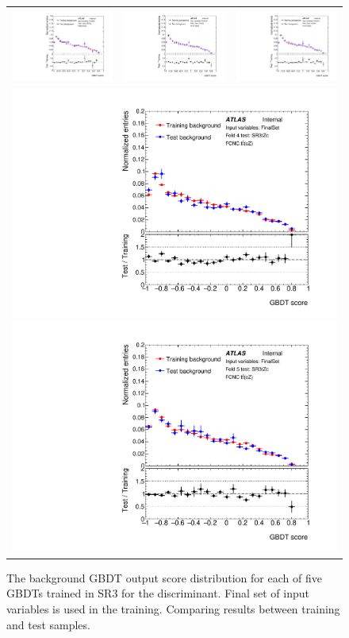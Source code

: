 \begin{figure}[!htbp]
	\centering
	\begin{tabular}{ccc}
		\includegraphics[width=.3\textwidth]{Chapters/CH5/figures/SR3_UsingSMT/BDT/FinalSet/GBDT_background_FinalSet_Fold1} &
		\includegraphics[width=.3\textwidth]{Chapters/CH5/figures/SR3_UsingSMT/BDT/FinalSet/GBDT_background_FinalSet_Fold2} &
		\includegraphics[width=.3\textwidth]{Chapters/CH5/figures/SR3_UsingSMT/BDT/FinalSet/GBDT_background_FinalSet_Fold3} \\
		\multicolumn{3}{c}{
		\includegraphics[width=.3\textwidth]{Chapters/CH5/figures/SR3_UsingSMT/BDT/FinalSet/GBDT_background_FinalSet_Fold4}
		\includegraphics[width=.3\textwidth]{Chapters/CH5/figures/SR3_UsingSMT/BDT/FinalSet/GBDT_background_FinalSet_Fold5}} \\
	\end{tabular}
	\caption{ The background GBDT output score distribution for each of five GBDTs trained in SR3 for the \Dthree discriminant.
		Final set of input variables is used in the training.
		Comparing results between training and test samples.
	}%
	\label{app:BDT:fig:SR3:GBDTbkgFinalSet}
\end{figure}

